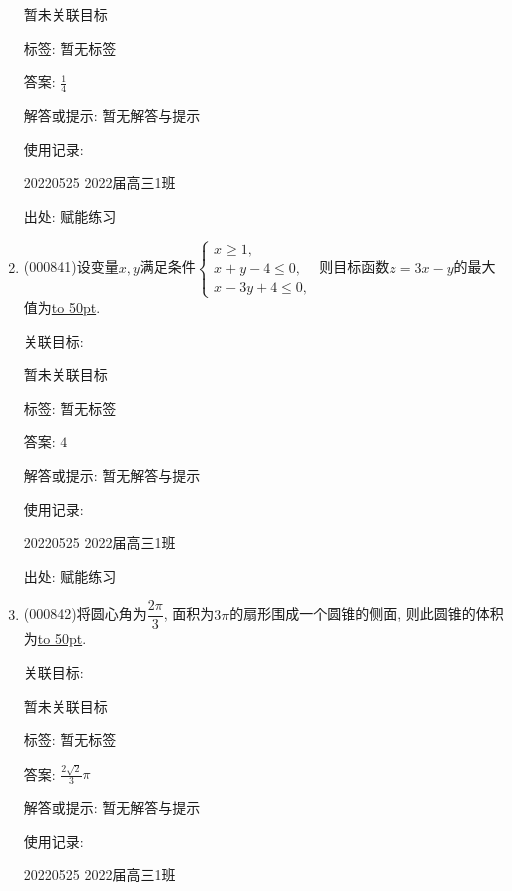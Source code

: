 \documentclass[10pt,a4paper]{article}
\newcommand{\blank}[1]{\underline{\hbox to #1pt{}}}
\begin{document}
\begin{enumerate}[1.]
暂未关联目标



标签: 暂无标签

答案: $\frac 14$

解答或提示: 暂无解答与提示

使用记录:

20220525	2022届高三1班	


出处: 赋能练习
\item { (000841)}设变量$x,y$满足条件$\begin{cases} x\ge 1, \\ x+y-4\le 0, \\  x-3y+4\le 0,  \end{cases}$ 则目标函数$z=3x-y$的最大值为\blank{50}.


关联目标:

暂未关联目标



标签: 暂无标签

答案: $4$

解答或提示: 暂无解答与提示

使用记录:

20220525	2022届高三1班	


出处: 赋能练习
\item { (000842)}将圆心角为$\dfrac{2\pi}3$, 面积为$3\pi$的扇形围成一个圆锥的侧面, 则此圆锥的体积为\blank{50}.


关联目标:

暂未关联目标



标签: 暂无标签

答案: $\frac{2\sqrt 2}3\pi$

解答或提示: 暂无解答与提示

使用记录:

20220525	2022届高三1班	



\end{enumerate}
\end{document}
